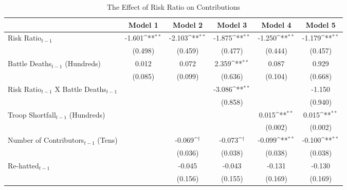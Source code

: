 \begin{table}[htbp]\centering
\footnotesize
\def\sym#1{\ifmmode^{#1}\else\(^{#1}\)\fi}
\caption{The Effect of Risk Ratio on Contributions \label{Table 2}}
\begin{tabular}{l*{5}{c}}
\hline\hline
                    &\multicolumn{1}{c}{Model 1} &\multicolumn{1}{c}{Model 2} &\multicolumn{1}{c}{Model 3} &\multicolumn{1}{c}{Model 4} &\multicolumn{1}{c}{Model 5}        \\
\hline
Risk Ratio$_{t-1}$          &      -1.601\sym{**}&      -2.103\sym{**}&      -1.875\sym{**}&      -1.250\sym{**}&      -1.179\sym{**}\\
                    &     (0.498)        &     (0.459)        &     (0.477)        &     (0.444)        &     (0.457)        \\
[0.5em]
Battle Deaths$_{t-1}$ (Hundreds)&       0.012        &       0.072        &       2.359\sym{**}&       0.087        &       0.929        \\
                    &     (0.085)        &     (0.099)        &     (0.636)        &     (0.104)        &     (0.668)        \\
Risk Ratio$_{t-1}$ X Battle Deaths$_{t-1}$&                    &                    &      -3.086\sym{**}&                    &      -1.150        \\
                    &                    &                    &     (0.858)        &                    &     (0.940)        \\
[0.5em]
Troop Shortfall$_{t-1}$ (Hundreds)&                    &                    &                    &       0.015\sym{**}&       0.015\sym{**}\\
                    &                    &                    &                    &     (0.002)        &     (0.002)        \\
[0.5em]
Number of Contributors$_{t-1}$ (Tens)&                    &      -0.069\sym{\dagger} &      -0.073\sym{\dagger} &      -0.099\sym{**}&      -0.100\sym{**}\\
                    &                    &     (0.036)        &     (0.038)        &     (0.038)        &     (0.038)        \\
[0.5em]
Re-hatted$_{t-1}$           &                    &      -0.045        &      -0.043        &      -0.131        &      -0.130        \\
                    &                    &     (0.156)        &     (0.155)        &     (0.169)        &     (0.169)        \\

\end{tabular}
\end{table}
